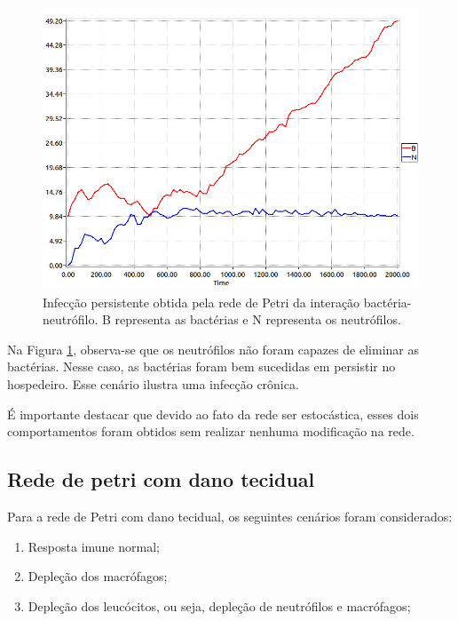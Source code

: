 \documentclass[a4paper,10pt]{article}
\begin{document}
		\begin{figure}
			\begin{center}
				\includegraphics[scale=0.45]{imagens/resultados/RedesimplesB_N-fig1.png}
			\end{center}
			\caption{Infecção persistente obtida pela rede de Petri da interação bactéria-neutrófilo.  
			B representa as bactérias e N representa os neutrófilos. 
			}
			\label{redeSimples_fig1}
		\end{figure}
				
		Na Figura \ref{redeSimples_fig1}, observa-se que os neutrófilos não foram capazes de eliminar as bactérias. 
		Nesse caso, as bactérias foram bem sucedidas em persistir no hospedeiro. Esse cenário ilustra uma infecção crônica. 
						
		É importante destacar que devido ao fato da rede ser estocástica, esses dois comportamentos foram obtidos sem realizar nenhuma 
		modificação na rede. 
		
		\subsection{Rede de petri com dano tecidual}
		
		Para a rede de Petri com dano tecidual, os seguintes cenários foram considerados: 		
		\begin{enumerate}
		 \item Resposta imune normal; 
		 \item Depleção dos macrófagos; 
		 \item Depleção dos leucócitos, ou seja, depleção de neutrófilos e macrófagos; 
		\end{enumerate}
		
\end{document}
